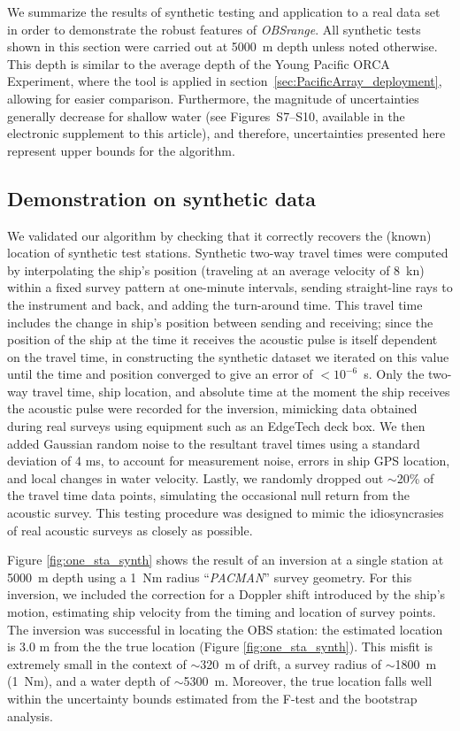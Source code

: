 We summarize the results of synthetic testing and application to a real data set in order to demonstrate the robust features of \textit{OBSrange}. All synthetic tests shown in this section were carried out at 5000~m depth unless noted otherwise. This depth is similar to the average depth of the Young Pacific ORCA Experiment, where the tool is applied in section~\ref{sec:PacificArray_deployment}, allowing for easier comparison. Furthermore, the magnitude of uncertainties generally decrease for shallow water (see Figures~S7--S10, available in the electronic supplement to this article), and therefore, uncertainties presented here represent upper bounds for the algorithm.

\subsection{Demonstration on synthetic data} \label{Demonstration on synthetic data}
We validated our algorithm by checking that it correctly recovers the (known) location of synthetic test stations. Synthetic two-way travel times were computed by interpolating the ship's position (traveling at an average velocity of 8~kn) within a fixed survey pattern at one-minute intervals, sending straight-line rays to the instrument and back, and adding the turn-around time. This travel time includes the change in ship's position between sending and receiving; since the position of the ship at the time it receives the acoustic pulse is itself dependent on the travel time, in constructing the synthetic dataset we iterated on this value until the time and position converged to give an error of \mbox{$<10^{-6}$ s}. Only the two-way travel time, ship location, and absolute time at the moment the ship receives the acoustic pulse were recorded for the inversion, mimicking data obtained during real surveys using equipment such as an EdgeTech deck box. We then added Gaussian random noise to the resultant travel times using a standard deviation of 4 ms, to account for measurement noise, errors in ship GPS location, and local changes in water velocity. Lastly, we randomly dropped out $\sim$20\% of the travel time data points, simulating the occasional null return from the acoustic survey. This testing procedure was designed to mimic the idiosyncrasies of real acoustic surveys as closely as possible. 

Figure \ref{fig:one_sta_synth} shows the result of an inversion at a single station at 5000~m depth using a 1~Nm radius ``\textit{PACMAN}'' survey geometry. For this inversion, we included the correction for a Doppler shift introduced by the ship's motion, estimating ship velocity from the timing and location of survey points. The inversion was successful in locating the OBS station: the estimated location is 3.0 m from the the true location (Figure \ref{fig:one_sta_synth}). This misfit is extremely small in the context of $\sim$320~m of drift, a survey radius of $\sim$1800~m (1~Nm), and a water depth of $\sim$5300~m. Moreover, the true location falls well within the uncertainty bounds estimated from the F-test and the bootstrap analysis. 

